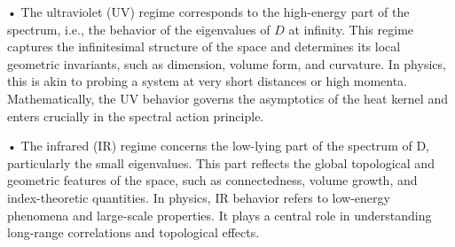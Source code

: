 \documentclass{article}
\begin{document}
	•	The ultraviolet (UV) regime corresponds to the high-energy part of the spectrum, i.e., the behavior of the eigenvalues of $D$ at infinity. This regime captures the infinitesimal structure of the space and determines its local geometric invariants, such as dimension, volume form, and curvature. In physics, this is akin to probing a system at very short distances or high momenta. Mathematically, the UV behavior governs the asymptotics of the heat kernel and enters crucially in the spectral action principle.
	
	•	The infrared (IR) regime concerns the low-lying part of the spectrum of D, particularly the small eigenvalues. This part reflects the global topological and geometric features of the space, such as connectedness, volume growth, and index-theoretic quantities. In physics, IR behavior refers to low-energy phenomena and large-scale properties. It plays a central role in understanding long-range correlations and topological effects.
\end{document}

